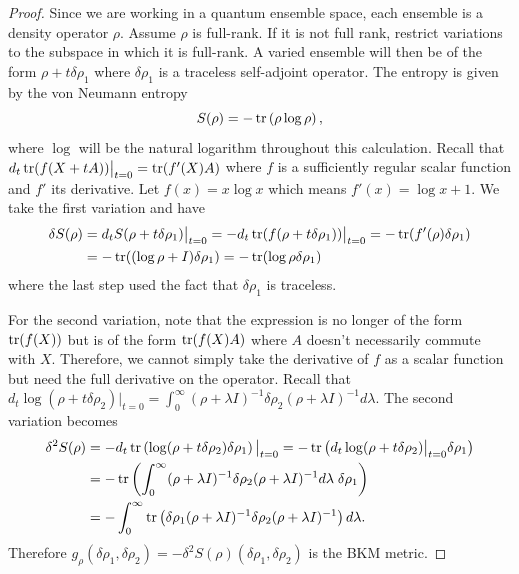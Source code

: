 \begin{mathSection}
\begin{proof}
	Since we are working in a quantum ensemble space, each ensemble is a density operator $\rho$. Assume $\rho$ is full-rank. If it is not full rank, restrict variations to the subspace in which it is full-rank. A varied ensemble will then be of the form $\rho + t \delta\rho_1$ where $\delta \rho_1$ is a traceless self-adjoint operator. The entropy is given by the von Neumann entropy
	\begin{equation}
		S(\rho) = - \operatorname{tr}\left(\rho \log \rho\right),
	\end{equation}
	where $\log$ will be the natural logarithm throughout this calculation. Recall that $d_t \operatorname{tr}(f(X+tA))\big|_{t=0} = \operatorname{tr}(f'(X)A)$ where $f$ is a sufficiently regular scalar function and $f'$ its derivative. Let $f(x) = x \log x$ which means $f'(x) = \log x + 1$. We take the first variation and have
	\begin{equation}
		\begin{aligned}
			\delta S(\rho) &= d_t S(\rho + t\delta\rho_1)\big|_{t=0} = - d_t \operatorname{tr}(f(\rho + t \delta \rho_1))\big|_{t=0} = -\operatorname{tr}(f'(\rho)\delta \rho_1) \\
			&= - \operatorname{tr}((\log \rho + I) \delta \rho_1) = - \operatorname{tr}(\log \rho \delta \rho_1)
		\end{aligned}
	\end{equation}
	where the last step used the fact that $\delta \rho_1$ is traceless.
	
	For the second variation, note that the expression is no longer of the form $\operatorname{tr}(f(X))$ but is of the form $\operatorname{tr}(f(X)A)$ where $A$ doesn't necessarily commute with $X$. Therefore, we cannot simply take the derivative of $f$ as a scalar function but need the full derivative on the operator. Recall that $d_t \log(\rho + t \delta\rho_2)\big|_{t=0} = \int_0^\infty (\rho + \lambda I)^{-1} \delta \rho_2 (\rho + \lambda I)^{-1} d\lambda$. The second variation becomes
	\begin{equation}
		\begin{aligned}
			\delta^2 S(\rho) &= - d_t \operatorname{tr}\left(\log(\rho + t \delta\rho_2) \delta \rho_1 \right) \big|_{t=0} =  -  \operatorname{tr}\left(d_t \log(\rho + t \delta\rho_2)\big|_{t=0} \delta \rho_1 \right)   \\
			&= - \operatorname{tr}\left(\int_0^\infty (\rho + \lambda I)^{-1} \delta \rho_2 (\rho + \lambda I)^{-1} d\lambda \; \delta \rho_1 \right) \\
			&= - \int_0^\infty \operatorname{tr}\left(\delta \rho_1  (\rho + \lambda I)^{-1} \delta \rho_2 (\rho + \lambda I)^{-1} \right) d\lambda.
		\end{aligned}
	\end{equation}
	Therefore $g_\rho(\delta\rho_1,\delta\rho_2)=-\delta^2S(\rho)(\delta\rho_1,\delta\rho_2)$ is the BKM metric.
\end{proof}


\end{mathSection}
